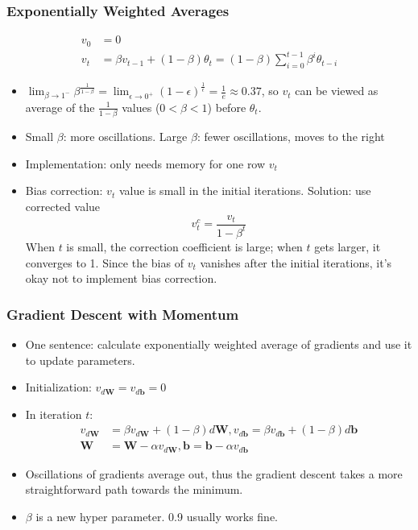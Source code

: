 \subsubsection{Exponentially Weighted Averages}
\begin{align*}
  v_0 &= 0\\
  v_t&=\beta v_{t-1}+(1-\beta)\theta_t=\left(1-\beta\right)\displaystyle\sum_{i=0}^{t-1}\beta^{i}\theta_{t-i}
\end{align*}
\begin{itemize}
  \item $\displaystyle\lim_{\beta\rightarrow 1^-}\beta^{\frac{1}{1-\beta}}=\displaystyle\lim_{\epsilon\rightarrow 0^+}(1-\epsilon)^{\frac{1}{\epsilon}}=\frac{1}{e}\approx 0.37$, so $v_t$ can be viewed as average of the $\frac{1}{1-\beta}$ values ($0<\beta<1$) before $\theta_t$.
  \item Small $\beta$: more oscillations. Large $\beta$: fewer oscillations, moves to the right
  \item Implementation: only needs memory for one row $v_t$ 
  \item Bias correction: $v_t$ value is small in the initial iterations. Solution: use corrected value 
  \[v_t^{c}=\frac{v_t}{1-\beta^t}\]
  When $t$ is small, the correction coefficient is large; when $t$ gets larger, it converges to 1. Since the bias of $v_t$ vanishes after the initial iterations, it's okay not to implement bias correction.
\end{itemize}
\subsubsection{Gradient Descent with Momentum}
\begin{itemize}
  \item One sentence: calculate exponentially weighted average of gradients and use it to update parameters. 
  \item Initialization: $v_{d\mathbf{W}}=v_{d\mathbf{b}}=0$
  \item In iteration $t$:
  \begin{align*}
    v_{d\mathbf{W}}&=\beta v_{d\mathbf{W}}+(1-\beta)d\mathbf{W}, v_{d\mathbf{b}}=\beta v_{d\mathbf{b}}+(1-\beta)d\mathbf{b}\\
    \mathbf{W}&=\mathbf{W}-\alpha v_{d\mathbf{W}}, \mathbf{b}=\mathbf{b}-\alpha v_{d\mathbf{b}}
  \end{align*}
  \item Oscillations of gradients average out, thus the gradient descent takes a more straightforward path towards the minimum.
  \item $\beta$ is a new hyper parameter. 0.9 usually works fine.
\end{itemize}
